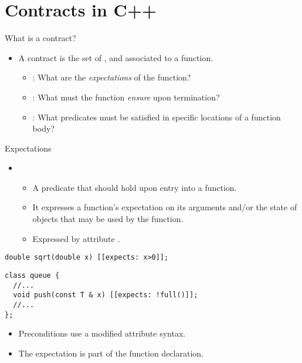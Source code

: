 \section{Contracts in C++}

\begin{frame}[t]{What is a contract?}
\begin{itemize}
  \item A contract is the set of ,
 and  associated to a function.
    \begin{itemize}
      \vfill\pause
      \item {}: What are the \emph{expectations} of the function?
      \vfill\pause
      \item {}: What must the function \emph{ensure}
            upon termination?
      \vfill\pause
      \item {}: What predicates must be satisfied in specific
            locations of a function body?
    \end{itemize}
\end{itemize}
\end{frame}

\begin{frame}[t,fragile]{Expectations}
\begin{itemize}
  \item {}
    \begin{itemize}
      \item A predicate that should hold upon entry into a function.
      \item It expresses a function's expectation on its arguments and/or the
            state of objects that may be used by the function.
      \item Expressed by attribute .
    \end{itemize}
\end{itemize}

\vfill\pause
\begin{lstlisting}
double sqrt(double x) [[expects: x>0]];
\end{lstlisting}
\pause
\begin{lstlisting}
class queue {
  //...
  void push(const T & x) [[expects: !full()]];
  //...
};
\end{lstlisting}

\vfill\pause
\begin{itemize}
  \item Preconditions use a modified attribute syntax.
  \item The expectation is part of the function declaration.
\end{itemize}

\end{frame}

